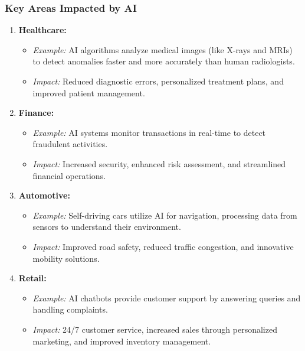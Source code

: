 \documentclass{beamer}
\begin{document}
\begin{frame}[fragile]
    \frametitle{Key Areas Impacted by AI}
    \begin{enumerate}
        \item \textbf{Healthcare:}
        \begin{itemize}
            \item \textit{Example:} AI algorithms analyze medical images (like X-rays and MRIs) to detect anomalies faster and more accurately than human radiologists.
            \item \textit{Impact:} Reduced diagnostic errors, personalized treatment plans, and improved patient management.
        \end{itemize}

        \item \textbf{Finance:}
        \begin{itemize}
            \item \textit{Example:} AI systems monitor transactions in real-time to detect fraudulent activities.
            \item \textit{Impact:} Increased security, enhanced risk assessment, and streamlined financial operations.
        \end{itemize}

        \item \textbf{Automotive:}
        \begin{itemize}
            \item \textit{Example:} Self-driving cars utilize AI for navigation, processing data from sensors to understand their environment.
            \item \textit{Impact:} Improved road safety, reduced traffic congestion, and innovative mobility solutions.
        \end{itemize}

        \item \textbf{Retail:}
        \begin{itemize}
            \item \textit{Example:} AI chatbots provide customer support by answering queries and handling complaints.
            \item \textit{Impact:} 24/7 customer service, increased sales through personalized marketing, and improved inventory management.
        \end{itemize}
    \end{enumerate}
\end{frame}
\end{document}
